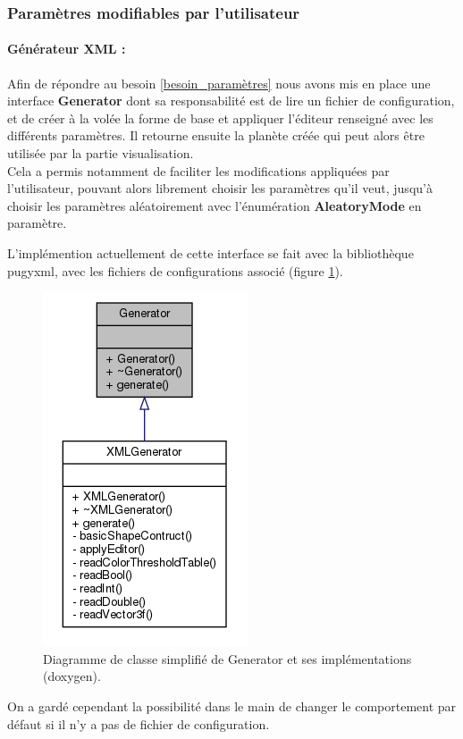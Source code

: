 \documentclass[a4paper]{article}
\begin{document}
\subsubsection{Paramètres modifiables par l'utilisateur}

\paragraph{Générateur XML :}

Afin de répondre au besoin \ref{besoin_paramètres} nous avons mis en place une interface \textbf{Generator} dont sa responsabilité est de lire un fichier de configuration, et de créer à la volée la forme de base et appliquer l'éditeur renseigné avec les différents paramètres.
Il retourne ensuite la planète créée qui peut alors être utilisée par la partie visualisation.\\
Cela a permis notamment de faciliter les modifications appliquées par l'utilisateur, pouvant alors librement choisir les paramètres qu'il veut, jusqu'à choisir les paramètres aléatoirement avec l'énumération \textbf{AleatoryMode} en paramètre.

L'implémention actuellement de cette interface se fait avec la bibliothèque pugyxml, avec les fichiers de configurations associé (figure \ref{archi_generator}).
    \begin{figure}[!ht]
        \begin{center} \includegraphics[width=0.3\linewidth]{img/archi/archi_generator.png}\end{center}
        \caption{\label{archi_generator}Diagramme de classe simplifié de Generator et ses implémentations (doxygen).}
    \end{figure}
    
On a gardé cependant la possibilité dans le main de changer le comportement par défaut si il n'y a pas de fichier de configuration.
\end{document}
